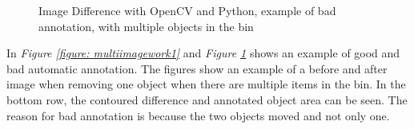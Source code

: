 \begin{figure}[ht]
    \centering
    \hspace{0.5cm}
    \hspace{0.5cm}
    \hspace{0.5cm}
    \caption{Image Difference with OpenCV and Python, example of bad annotation, with multiple objects in the bin}
    \label{figure: multiimagework2}
\end{figure}

In \textit{Figure \ref{figure: multiimagework1}} and \textit{Figure \ref{figure: multiimagework2}} shows an example of good and bad automatic annotation. The figures show an example of a before and after image when removing one object when there are multiple items in the bin. In the bottom row, the contoured difference and annotated object area can be seen. The reason for bad annotation is because the two objects moved and not only one.   

